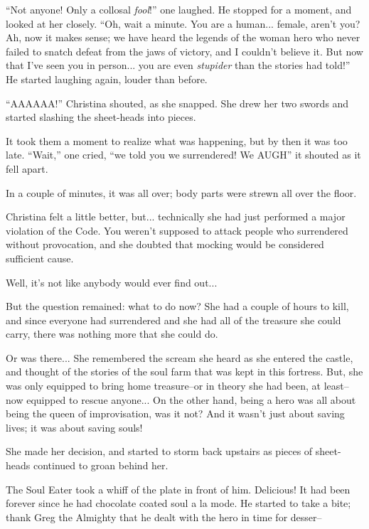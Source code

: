 \documentclass[showtrims,b6paper,draft,10pt]{memoir}
\begin{document}
``Not anyone!  Only a collosal \emph{fool}!''  one laughed.  He stopped for a moment, and looked at her closely.  ``Oh, wait a minute.  You are a human... female, aren't you?  Ah, now it makes sense;  we have heard the legends of the woman hero who never failed to snatch defeat from the jaws of victory, and I couldn't believe it.  But now that I've seen you in person... you are even \emph{stupider} than the stories had told!''  He started laughing again, louder than before.

``AAAAAA!'' Christina shouted, as she snapped.  She drew her two swords and started slashing the sheet-heads into pieces.

It took them a moment to realize what was happening, but by then it was too late.  ``Wait,'' one cried, ``we told you we surrendered!  We AUGH'' it shouted as it fell apart.

In a couple of minutes, it was all over;  body parts were strewn all over the floor.

Christina felt a little better, but... technically she had just performed a major violation of the Code.  You weren't supposed to attack people who surrendered without provocation, and she doubted that mocking would be considered sufficient cause.

Well, it's not like anybody would ever find out...

But the question remained:  what to do now?  She had a couple of hours to kill, and since everyone had surrendered and she had all of the treasure she could carry, there was nothing more that she could do.

Or was there...  She remembered the scream she heard as she entered the castle, and thought of the stories of the soul farm that was kept in this fortress.  But, she was only equipped to bring home treasure--or in theory she had been, at least--now equipped to rescue anyone... On the other hand, being a hero was all about being the queen of improvisation, was it not?  And it wasn't just about saving lives;  it was about saving souls!

She made her decision, and started to storm back upstairs as pieces of sheet-heads continued to groan behind her.

\timeskip
The Soul Eater took a whiff of the plate in front of him.  Delicious!  It had been forever since he had chocolate coated soul a la mode.  He started to take a bite;  thank Greg the Almighty that he dealt with the hero in time for desser--
\end{document}
